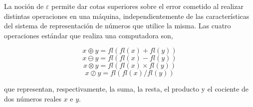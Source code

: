 
La noción de $\varepsilon$ permite dar cotas superiores sobre el error cometido al realizar distintas operaciones en una máquina, independientemente de las características del sistema de representación de números que utilice la misma. Las cuatro operaciones estándar que realiza una computadora son,

\[x \oplus y = fl(fl(x) + fl(y))\]
\[x \ominus y = fl(fl(x) - fl(y))\]
\[x \otimes y = fl(fl(x) \times fl(y))\]
\[x \oslash y = fl(fl(x) / fl(y))\]

que representan, respectivamente, la suma, la resta, el producto y el cociente de dos números reales $x$ e $y$.


